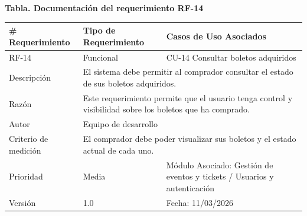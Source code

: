 \documentclass[12pt,letterpaper]{article}
\begin{document}
\noindent
\begin{minipage}{\textwidth}
\centering
\scriptsize
\renewcommand{\arraystretch}{0.9}
\setlength{\tabcolsep}{3pt}
\setlength{\arrayrulewidth}{0.5pt}

\textbf{Tabla. Documentación del requerimiento RF-14}

\vspace{2pt}

\begin{tabularx}{\textwidth}{|p{2.6cm}|X|p{3.4cm}|}
\hline
\# Requerimiento & Tipo de Requerimiento & Casos de Uso Asociados \\ \hline
RF-14 & Funcional & CU-14 Consultar boletos adquiridos \\ \hline
Descripción & \multicolumn{2}{X|}{El sistema debe permitir al comprador consultar el estado de sus boletos adquiridos.} \\ \hline
Razón & \multicolumn{2}{X|}{Este requerimiento permite que el usuario tenga control y visibilidad sobre los boletos que ha comprado.} \\ \hline
Autor & \multicolumn{2}{X|}{Equipo de desarrollo} \\ \hline
Criterio de medición & \multicolumn{2}{X|}{El comprador debe poder visualizar sus boletos y el estado actual de cada uno.} \\ \hline
Prioridad & Media & Módulo Asociado: Gestión de eventos y tickets / Usuarios y autenticación \\ \hline
Versión & 1.0 & Fecha: 11/03/2026 \\ \hline
\end{tabularx}
\end{minipage}

\vspace{0.2cm}
\end{document}
